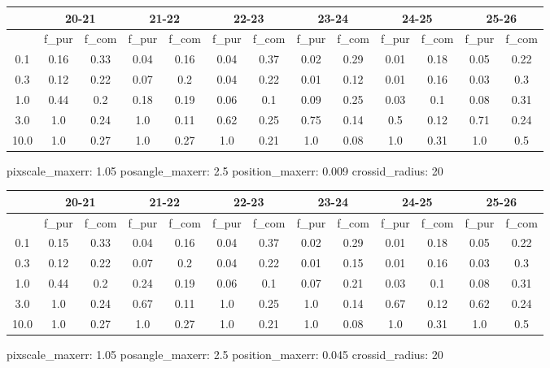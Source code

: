 \documentclass{article}
\begin{document}
\begin{figure}[H]
\centering
\begin{tabular}{|c|c|c|c|c|c|c|c|c|c|c|c|c|}
\hline
\multicolumn{1}{|c|}{} & \multicolumn{2}{|c|}{20-21} & \multicolumn{2}{|c|}{21-22} & \multicolumn{2}{|c|}{22-23} & \multicolumn{2}{|c|}{23-24} & \multicolumn{2}{|c|}{24-25} & \multicolumn{2}{|c|}{25-26}\\
\hline \hline
 & f\_pur & f\_com & f\_pur & f\_com & f\_pur & f\_com & f\_pur & f\_com & f\_pur & f\_com & f\_pur & f\_com \\
\hline
0.1 & 0.16 & 0.33 & 0.04 & 0.16 & 0.04 & 0.37 & 0.02 & 0.29 & 0.01 & 0.18 & 0.05 & 0.22\\
\hline
0.3 & 0.12 & 0.22 & 0.07 & 0.2 & 0.04 & 0.22 & 0.01 & 0.12 & 0.01 & 0.16 & 0.03 & 0.3\\
\hline
1.0 & 0.44 & 0.2 & 0.18 & 0.19 & 0.06 & 0.1 & 0.09 & 0.25 & 0.03 & 0.1 & 0.08 & 0.31\\
\hline
3.0 & 1.0 & 0.24 & 1.0 & 0.11 & 0.62 & 0.25 & 0.75 & 0.14 & 0.5 & 0.12 & 0.71 & 0.24\\
\hline
10.0 & 1.0 & 0.27 & 1.0 & 0.27 & 1.0 & 0.21 & 1.0 & 0.08 & 1.0 & 0.31 & 1.0 & 0.5\\
\hline
\end{tabular}
\caption{pixscale\_maxerr: 1.05 posangle\_maxerr: 2.5 position\_maxerr: 0.009 crossid\_radius: 20}
\end{figure}

\begin{figure}[H]
\centering
\begin{tabular}{|c|c|c|c|c|c|c|c|c|c|c|c|c|}
\hline
\multicolumn{1}{|c|}{} & \multicolumn{2}{|c|}{20-21} & \multicolumn{2}{|c|}{21-22} & \multicolumn{2}{|c|}{22-23} & \multicolumn{2}{|c|}{23-24} & \multicolumn{2}{|c|}{24-25} & \multicolumn{2}{|c|}{25-26}\\
\hline \hline
 & f\_pur & f\_com & f\_pur & f\_com & f\_pur & f\_com & f\_pur & f\_com & f\_pur & f\_com & f\_pur & f\_com \\
\hline
0.1 & 0.15 & 0.33 & 0.04 & 0.16 & 0.04 & 0.37 & 0.02 & 0.29 & 0.01 & 0.18 & 0.05 & 0.22\\
\hline
0.3 & 0.12 & 0.22 & 0.07 & 0.2 & 0.04 & 0.22 & 0.01 & 0.15 & 0.01 & 0.16 & 0.03 & 0.3\\
\hline
1.0 & 0.44 & 0.2 & 0.24 & 0.19 & 0.06 & 0.1 & 0.07 & 0.21 & 0.03 & 0.1 & 0.08 & 0.31\\
\hline
3.0 & 1.0 & 0.24 & 0.67 & 0.11 & 1.0 & 0.25 & 1.0 & 0.14 & 0.67 & 0.12 & 0.62 & 0.24\\
\hline
10.0 & 1.0 & 0.27 & 1.0 & 0.27 & 1.0 & 0.21 & 1.0 & 0.08 & 1.0 & 0.31 & 1.0 & 0.5\\
\hline
\end{tabular}
\caption{pixscale\_maxerr: 1.05 posangle\_maxerr: 2.5 position\_maxerr: 0.045 crossid\_radius: 20}
\end{figure}
\end{document}
